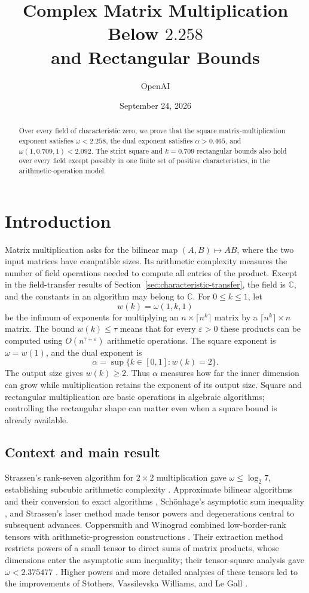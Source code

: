 \documentclass[11pt]{article}
\title{Complex Matrix Multiplication Below \(2.258\)\\and Rectangular Bounds}
\author{OpenAI}
\date{September 24, 2026}
\numberwithin{equation}{section}
\theoremstyle{definition}
\theoremstyle{remark}
\newcommand{\C}{\mathbb C}
\begin{document}
\maketitle
\begin{abstract}
Over every field of characteristic zero, we prove that the square
matrix-multiplication exponent satisfies \(\omega<2.258\), the dual exponent
satisfies \(\alpha>0.465\), and \(\omega(1,0.709,1)<2.092\). The strict
square and \(k=0.709\) rectangular bounds also hold over every field except
possibly in one finite set of positive characteristics, in the
arithmetic-operation model.
\end{abstract}
\tableofcontents
\section{Introduction}\label{sec:introduction}

Matrix multiplication asks for the bilinear map \((A,B)\mapsto AB\),
where the two input matrices have compatible sizes.  Its arithmetic
complexity measures the number of field operations needed to compute
all entries of the product.  Except in the field-transfer results
of Section~\ref{sec:characteristic-transfer}, the field is \(\C\), and
the constants in an algorithm may belong to \(\C\).
For \(0\le k\le1\), let
\[
 w(k)=\omega(1,k,1)
\]
be the infimum of exponents for multiplying an
\(n\times\lceil n^k\rceil\) matrix by a
\(\lceil n^k\rceil\times n\) matrix.
The bound \(w(k)\le\tau\) means that for every \(\varepsilon>0\)
these products can be computed using \(O(n^{\tau+\varepsilon})\)
arithmetic operations.
The square exponent is \(\omega=w(1)\), and the dual exponent is
\[
 \alpha=\sup\{k\in[0,1]:w(k)=2\}.
\]
The output size gives \(w(k)\ge2\).  Thus \(\alpha\) measures how far
the inner dimension can grow while multiplication retains the exponent
of its output size.  Square and rectangular multiplication are basic
operations in algebraic algorithms; controlling the rectangular shape
can matter even when a square bound is already available.

\subsection{Context and main result}

Strassen's rank-seven algorithm for \(2\times2\) multiplication gave
\(\omega\le\log_2 7\), establishing subcubic arithmetic complexity
\cite{strassen}.  Approximate bilinear algorithms and their conversion
to exact algorithms \cite{bini}, Sch\"onhage's asymptotic sum inequality
\cite{schonhage}, and Strassen's laser method \cite{strassen-laser}
made tensor powers and degenerations central to subsequent advances.
Coppersmith and Winograd combined low-border-rank tensors with
arithmetic-progression constructions \cite{cw}.  Their extraction
method restricts powers of a small tensor to direct sums of matrix
products, whose dimensions enter the asymptotic sum inequality;
their tensor-square analysis gave \(\omega<2.375477\)
\cite[Section~8]{cw}.
Higher powers and more detailed analyses of these tensors
led to the improvements of Stothers, Vassilevska Williams, and Le Gall
\cite{stothers,williams-powers,legall-powers}.
\end{document}
